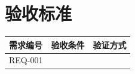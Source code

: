 \section{验收标准}

\begin{longtable}{|p{28mm}|p{90mm}|p{30mm}|}
\hline
\textbf{需求编号} & \textbf{验收条件} & \textbf{验证方式} \\
\hline
REQ-001 &  &  \\
\hline
\end{longtable}
